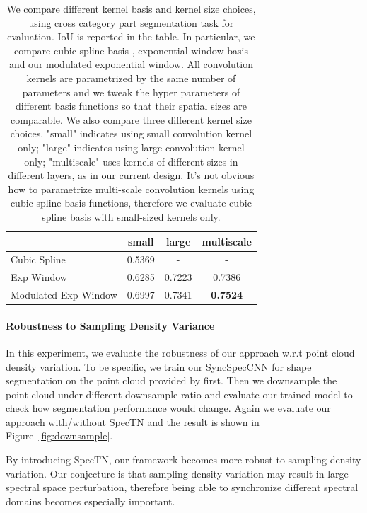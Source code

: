 \begin{table}[h!]
\centering
\small
{
\begin{tabular}{@{}lccc}
\toprule
 & small & large & multiscale \\ \midrule
Cubic Spline & 0.5369 & \multicolumn{1}{c}{-} & \multicolumn{1}{c}{-} \\
Exp Window & 0.6285 & 0.7223 & 0.7386 \\
Modulated Exp Window & 0.6997 & 0.7341 & \textbf{0.7524} \\ \bottomrule
\end{tabular}
}
\caption{We compare different kernel basis and kernel size choices, using cross category part segmentation task for evaluation. IoU is reported in the table. In particular, we compare cubic spline basis \cite{bruna2013spectral}, exponential window basis \cite{boscaini2016learning} and our modulated exponential window. All convolution kernels are parametrized by the same number of parameters and we tweak the hyper parameters of different basis functions so that their spatial sizes are comparable. We also compare three different kernel size choices. "small" indicates using small convolution kernel only; "large" indicates using large convolution kernel only; "multiscale" uses kernels of different sizes in different layers, as in our current design. It's not obvious how to parametrize multi-scale convolution kernels using cubic spline basis functions, therefore we evaluate cubic spline basis with small-sized kernels only.} 
\label{tab:kerneldesign}
\vspace{-0.3cm}
\end{table}

\paragraph{Robustness to Sampling Density Variance}
In this experiment, we evaluate the robustness of our approach w.r.t point cloud density variation. To be specific, we train our SyncSpecCNN for shape segmentation on the point cloud provided by \cite{Yi16} first. Then we downsample the point cloud under different downsample ratio and evaluate our trained model to check how segmentation performance would change. Again we evaluate our approach with/without SpecTN and the result is shown in Figure~\ref{fig:downsample}.
 
By introducing SpecTN, our framework becomes more robust to sampling density variation. Our conjecture is that sampling density variation may result in large spectral space perturbation, therefore being able to synchronize different spectral domains becomes especially important.

